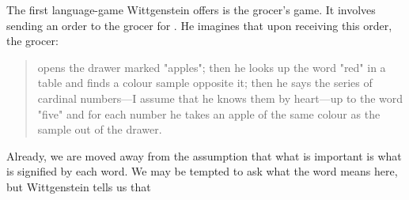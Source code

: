 \documentclass[doc,12pt,apacite,biblatex]{apa6}
\begin{document}
The first language-game Wittgenstein offers is the grocer's game. It involves
sending an order to the grocer for . He imagines that upon
receiving this order, the grocer: \begin{quote}
	opens the drawer marked "apples"; then he looks up the word "red" in a
	table and finds a colour sample opposite it; then he says the series of
	cardinal numbers---I assume that he knows them by heart---up to the word
	"five" and for each number he takes an apple of the same colour as the
	sample out of the drawer.\cite[\S~1]{Wittgenstein53}
\end{quote}
Already, we are moved away from the assumption that what is important is what
is signified by each word. 
%
We may be tempted to ask what the word  means here, but Wittgenstein
tells us that 
\end{document}
